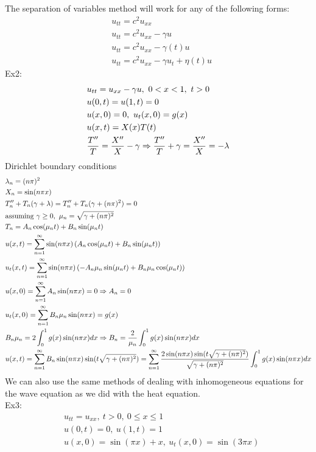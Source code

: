 \documentclass[11pt, fleqn]{article}
\begin{document}
The separation of variables method will work for any of the following forms:
\begin{align*}
    &u_{tt}=c^2u_{xx}\\
    &u_{tt}=c^2u_{xx}-\gamma u\\
    &u_{tt}=c^2u_{xx}-\gamma(t)u\\
    &u_{tt}=c^2u_{xx}-\gamma u_t+\eta(t) u
\end{align*}
Ex2:
\begin{align*}
    &u_{tt}=u_{xx}-\gamma u,\ 0<x<1,\ t>0\\
    &u(0,t)=u(1,t)=0\\
    &u(x,0)=0,\ u_t(x,0)=g(x)\\
    &u(x,t)=X(x)T(t)\\
    &\frac{T''}{T}=\frac{X''}{X}-\gamma\Rightarrow \frac{T''}{T}+\gamma=\frac{X''}{X}=-\lambda
\end{align*}
Dirichlet boundary conditions
\begin{align*}
    &\lambda_n=(n\pi)^2\\
    &X_n=\sin(n\pi x)\\
    &T_n''+T_n(\gamma+\lambda)=T_n''+T_n(\gamma+(n\pi)^2)=0\\
    &\text{assuming }\gamma\geq0,\ \mu_n=\sqrt{\gamma+(n\pi)^2}\\
    &T_n=A_n\cos(\mu_nt)+B_n\sin(\mu_nt)\\
    &u(x,t)=\sum_{n=1}^\infty\sin(n\pi x)\left( A_n\cos(\mu_nt)+B_n\sin(\mu_nt) \right)\\
    &u_t(x,t)=\sum_{n=1}^\infty\sin(n\pi x)\left( -A_n\mu_n\sin(\mu_nt)+B_n\mu_n\cos(\mu_nt) \right)\\
    &u(x,0)=\sum_{n=1}^\infty A_n\sin(n\pi x)=0\Rightarrow A_n=0\\
    &u_t(x,0)=\sum_{n=1}^\infty B_n\mu_n\sin(n\pi x)=g(x)\\
    &B_n\mu_n=2\int_0^1g(x)\sin(n\pi x)dx\Rightarrow B_n=\frac{2}{\mu_n}\int_0^1g(x)\sin(n\pi x)dx\\
    &u(x,t)=\sum_{n=1}^\infty B_n\sin(n\pi x)\sin(t\sqrt{\gamma+(n\pi)^2})=\sum_{n=1}^\infty\frac{2\sin(n\pi x)\sin(t\sqrt{\gamma+(n\pi)^2})}{\sqrt{\gamma+(n\pi)^2}}\int_0^1g(x)\sin(n\pi x)dx
\end{align*}
We can also use the same methods of dealing with inhomogeneous equations for the wave equation as we did with the heat equation.\\
Ex3:
\begin{align*}
    &u_{tt}=u_{xx},\ t>0,\ 0\leq x\leq 1\\
    &u(0,t)=0,\ u(1,t)=1\\
    &u(x,0)=\sin(\pi x)+x,\ u_t(x,0)=\sin(3\pi x)
\end{align*}
\end{document}
